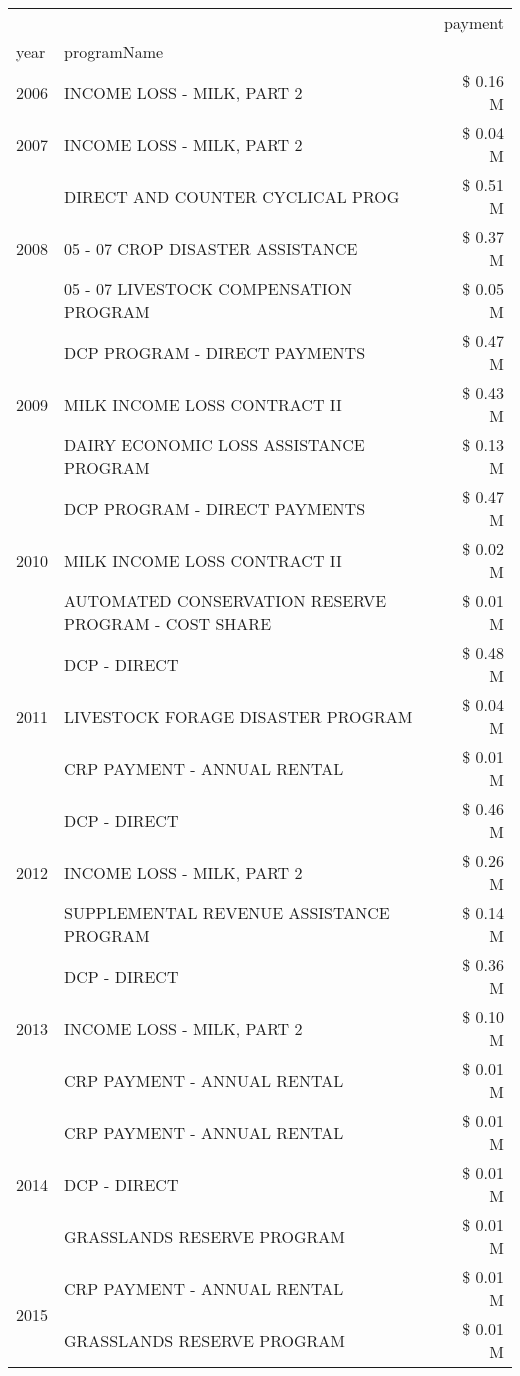 \begin{tabular}{llr}
\toprule
 &  & payment \\
year & programName &  \\
\midrule
2006 & INCOME LOSS - MILK, PART 2 & \$ 0.16 M \\
\cline{1-3}
2007 & INCOME LOSS - MILK, PART 2 & \$ 0.04 M \\
\cline{1-3}
\multirow[t]{3}{*}{2008} & DIRECT AND COUNTER CYCLICAL PROG & \$ 0.51 M \\
 & 05 - 07 CROP DISASTER ASSISTANCE & \$ 0.37 M \\
 & 05 - 07 LIVESTOCK COMPENSATION PROGRAM & \$ 0.05 M \\
\cline{1-3}
\multirow[t]{3}{*}{2009} & DCP PROGRAM - DIRECT PAYMENTS & \$ 0.47 M \\
 & MILK INCOME LOSS CONTRACT II & \$ 0.43 M \\
 & DAIRY ECONOMIC LOSS ASSISTANCE PROGRAM & \$ 0.13 M \\
\cline{1-3}
\multirow[t]{3}{*}{2010} & DCP PROGRAM - DIRECT PAYMENTS & \$ 0.47 M \\
 & MILK INCOME LOSS CONTRACT II & \$ 0.02 M \\
 & AUTOMATED CONSERVATION RESERVE PROGRAM - COST SHARE & \$ 0.01 M \\
\cline{1-3}
\multirow[t]{3}{*}{2011} & DCP - DIRECT & \$ 0.48 M \\
 & LIVESTOCK FORAGE DISASTER PROGRAM & \$ 0.04 M \\
 & CRP PAYMENT - ANNUAL RENTAL & \$ 0.01 M \\
\cline{1-3}
\multirow[t]{3}{*}{2012} & DCP - DIRECT & \$ 0.46 M \\
 & INCOME LOSS - MILK, PART 2 & \$ 0.26 M \\
 & SUPPLEMENTAL REVENUE ASSISTANCE PROGRAM & \$ 0.14 M \\
\cline{1-3}
\multirow[t]{3}{*}{2013} & DCP - DIRECT & \$ 0.36 M \\
 & INCOME LOSS - MILK, PART 2 & \$ 0.10 M \\
 & CRP PAYMENT - ANNUAL RENTAL & \$ 0.01 M \\
\cline{1-3}
\multirow[t]{3}{*}{2014} & CRP PAYMENT - ANNUAL RENTAL & \$ 0.01 M \\
 & DCP - DIRECT & \$ 0.01 M \\
 & GRASSLANDS RESERVE PROGRAM & \$ 0.01 M \\
\cline{1-3}
\multirow[t]{3}{*}{2015} & CRP PAYMENT - ANNUAL RENTAL & \$ 0.01 M \\
 & GRASSLANDS RESERVE PROGRAM & \$ 0.01 M \\

\end{tabular}
